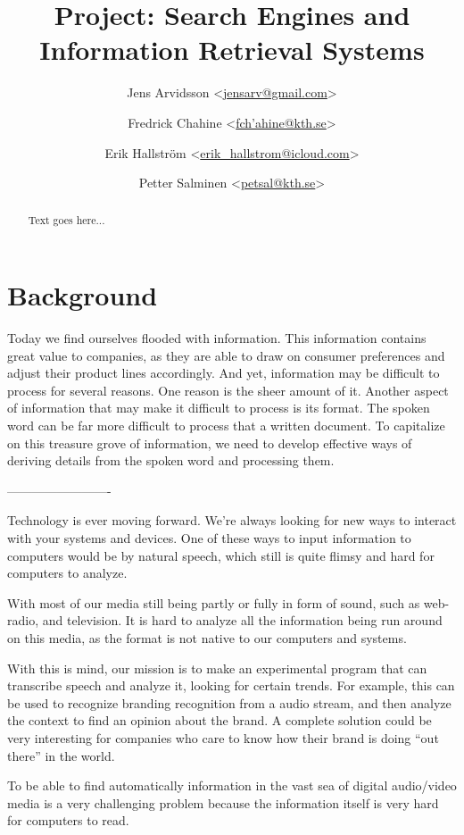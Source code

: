 \documentclass[a4paper,12pt,twoside]{ltxdoc}
\title{Project: Search Engines and Information Retrieval Systems}
\author{
Jens Arvidsson <\href{mailto:jensarv@gmail.com}{jensarv@gmail.com}> \and
Fredrick Chahine <\href{mailto:fchahine@kth.se}{fch'ahine@kth.se}> \and
Erik Hallström  <\href{mailto:erik_hallstrom@icloud.com}{erik\_hallstrom@icloud.com}> \and
Petter Salminen <\href{mailto:petsal@kth.se}{petsal@kth.se}>}
\begin{document}
\maketitle
\tableofcontents

\newpage
\begin{abstract}
Text goes here...

\end{abstract}

\newpage
\section{Background}
Today we find ourselves flooded with information. This information contains great value to companies, as they are
able to draw on consumer preferences and adjust their product lines accordingly. And yet, information may be difficult
to process for several reasons. One reason is the sheer amount of it. Another aspect of information that may make it difficult
to process is its format. The spoken word can be far more difficult to process that a written document. To capitalize on this treasure
grove of information, we need to develop effective ways of deriving details from the spoken word and processing them.

-------------------------

Technology is ever moving forward.
We're always looking for new ways to interact with your systems and devices.
One of these ways to input information to computers would be by natural speech,
which still is quite flimsy and hard for computers to analyze. 

With most of our media still being partly or fully in form of sound, such  as web-radio, and television.
It is hard to analyze all the information being run around on this media, as the format is not
native to our computers and systems. 

With this is mind, our mission is to make an experimental program that can transcribe speech and analyze it, looking for certain trends.
For example, this can be used to recognize branding recognition from a audio stream, and then analyze the context to find an opinion about the brand.
A complete solution could be very interesting for companies who care to know how their brand is doing ``out there'' in the world.

To be able to find automatically information in the vast sea of digital audio/video media is a very challenging problem
because the information itself is very hard for computers to read. 
\end{document}
